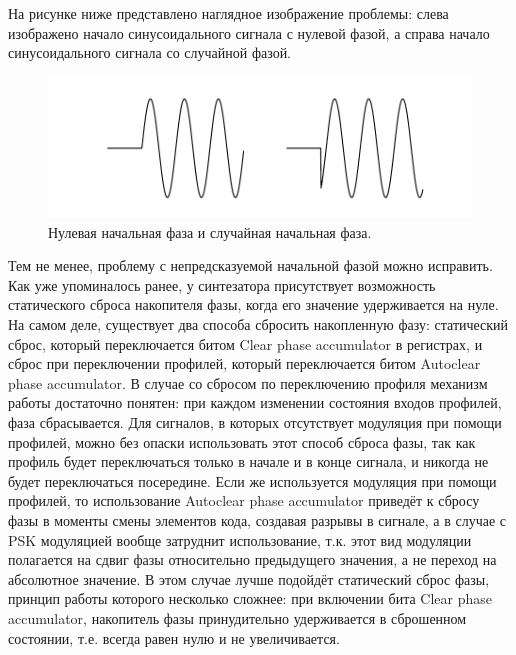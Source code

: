 \documentclass[rusmathsym, eqnumwithinsec, amspack, hyperref]{bomgost}
\begin{document}
На рисунке ниже представлено наглядное изображение проблемы: слева изображено начало синусоидального сигнала с нулевой фазой, а справа начало синусоидального сигнала со случайной фазой.

%
%
\begin{gostfigure}
\begin{figure}[H]
\centering
\includegraphics{data/random_start_phase.pdf}
\caption{Нулевая начальная фаза и случайная начальная фаза.}
\label{fig:random_start_phase}
\end{figure}
\end{gostfigure}

Тем не менее, проблему с непредсказуемой начальной фазой можно исправить. Как уже упоминалось ранее, у синтезатора присутствует возможность статического сброса накопителя фазы, когда его значение удерживается на нуле. На самом деле, существует два способа сбросить накопленную фазу: статический сброс, который переключается битом \textenglish{Clear phase accumulator} в регистрах, и сброс при переключении профилей, который переключается битом Autoclear phase accumulator. В случае со сбросом по переключению профиля механизм работы достаточно понятен: при каждом изменении состояния входов профилей, фаза сбрасывается. Для сигналов, в которых отсутствует модуляция при помощи профилей, можно без опаски использовать этот способ сброса фазы, так как профиль будет переключаться только в начале и в конце сигнала, и никогда не будет переключаться посередине. Если же используется модуляция при помощи профилей, то использование Autoclear phase accumulator приведёт к сбросу фазы в моменты смены элементов кода, создавая разрывы в сигнале, а в случае с PSK модуляцией вообще затруднит использование, т.к. этот вид модуляции полагается на сдвиг фазы относительно предыдущего значения, а не переход на абсолютное значение. В этом случае лучше подойдёт статический сброс фазы, принцип работы которого несколько сложнее: при включении бита Clear phase accumulator, накопитель фазы принудительно удерживается в сброшенном состоянии, т.е. всегда равен нулю и не увеличивается.
\end{document}
